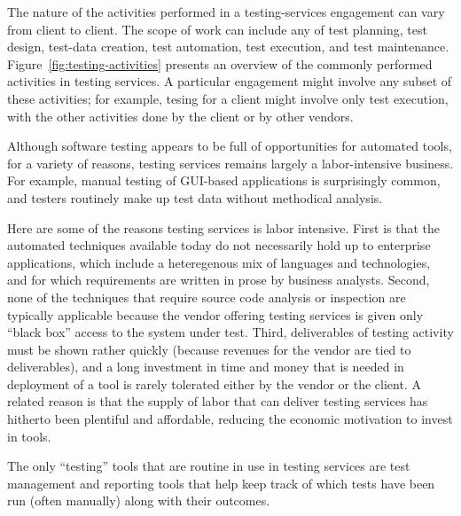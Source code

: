 The nature of the activities performed in a testing-services engagement can vary
from client to client. The scope of work can include any of test planning, test design,
test-data creation, test automation, test execution, and test maintenance. 
Figure~\ref{fig:testing-activities} presents an overview of
the commonly performed activities in testing services. 
A particular engagement might involve any subset of these activities; for example,
tesing for a client might involve only test execution, with the other
activities done by the client or by other vendors.  


Although software testing appears to be full of opportunities for automated tools,
for a variety of reasons, testing services remains largely a labor-intensive
business.  For example, manual testing of GUI-based applications is surprisingly
common, and testers routinely make up test data without methodical analysis.

Here are some of the reasons testing services is labor intensive.  First is that
the automated techniques available today do not necessarily hold up to enterprise
applications, which include a heteregenous mix of languages and technologies, and
for which requirements are written in prose by business analysts.
Second, none of the techniques that require source code analysis or inspection
are typically applicable because the vendor offering testing services is given
only ``black box'' access to the system under test.  Third, deliverables of testing
activity must be shown rather quickly (because revenues for the vendor are
tied to deliverables), and a long investment in time and money that
is needed in deployment of a tool is rarely tolerated either by the vendor or the
client.  A related reason is that the supply of labor that can deliver testing services 
has hitherto been plentiful and affordable, reducing the economic motivation to invest 
in tools.

The only ``testing'' tools that are routine in use in testing services are test management 
and reporting tools that help keep track of which tests have been run (often manually) along with
their outcomes.

